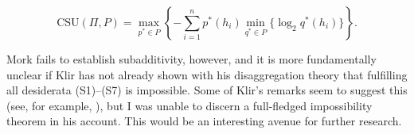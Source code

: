 \begin{equation}
  \label{eq:aeghapoo}
  \mbox{CSU}(\Pi,P)=\max_{p^{*}\in{}P}\left\{-\sum_{i=1}^{n}p^{*}(h_{i})\min_{q^{*}\in{}P}\{\log_{2}q^{*}(h_{i})\}\right\}.
\end{equation}

Mork fails to establish subadditivity, however, and it is more
fundamentally unclear if Klir has not already shown with his
disaggregation theory that fulfilling all desiderata (S1)--(S7) is
impossible. Some of Klir's remarks seem to suggest this (see, for
example, ), but I was unable to discern a
full-fledged impossibility theorem in his account. This would be an
interesting avenue for further research.

